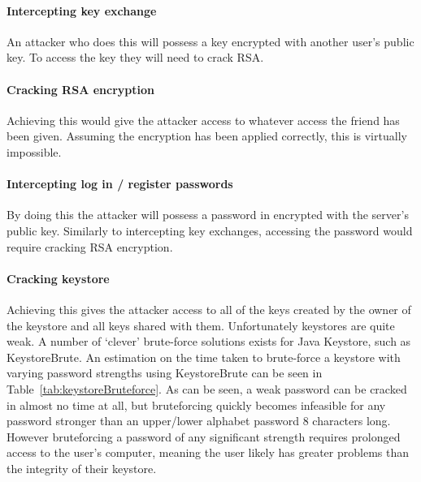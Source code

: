 \documentclass[12pt, titlepage]{article}
\begin{document}
\paragraph*{Intercepting key exchange} An attacker who does this will possess a key encrypted with another user's public key. To access the key they will need to crack RSA.

\paragraph*{Cracking RSA encryption} Achieving this would give the attacker access to whatever access the friend has been given. Assuming the encryption has been applied correctly, this is virtually impossible.

\paragraph*{Intercepting log in / register passwords} By doing this the attacker will possess a password in encrypted with the server's public key. Similarly to intercepting key exchanges, accessing the password would require cracking RSA encryption.

\paragraph*{Cracking keystore} Achieving this gives the attacker access to all of the keys created by the owner of the keystore and all keys shared with them. Unfortunately keystores are quite weak. A number of `clever' brute-force solutions exists for Java Keystore, such as KeystoreBrute.\cite{keystoreBrute} An estimation on the time taken to brute-force a keystore with varying password strengths using KeystoreBrute can be seen in Table~\ref{tab:keystoreBruteforce}. As can be seen, a weak password can be cracked in almost no time at all, but bruteforcing quickly becomes infeasible for any password stronger than an upper/lower alphabet password 8 characters long. However bruteforcing a password of any significant strength requires prolonged access to the user's computer, meaning the user likely has greater problems than the integrity of their keystore.
\end{document}

